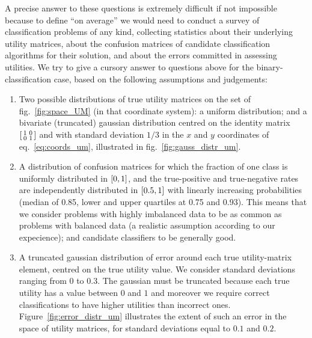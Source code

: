 \documentclass[\ifafour a4paper,12pt,\else a5paper,10pt,\fi%
onecolumn,oneside,article,%
british%
]{memoir}
\theoremstyle{remark}
\theoremstyle{innote}
\DeclarePairedDelimiter\clcl{[}{]}
\renewcommand*{\|}[1][]{\nonscript\:#1\vert\nonscript\:\mathopen{}}
\newcommand*{\eqn}{eq.}%
\newcommand*{\fig}{fig.}%
\begin{document}
A precise answer to these questions is extremely difficult if not impossible because to define \enquote{on average} we would need to conduct a survey of classification problems of any kind, collecting statistics about their underlying utility matrices, about the confusion matrices of candidate classification algorithms for their solution, and about the errors committed in assessing utilities. We try to give a cursory answer to questions above for the binary-classification case, based on the following assumptions and judgements:
\begin{enumerate}[label=(\roman*)]
\item\label{item:distr_um} Two possible distributions of true utility matrices on the set of \fig~\ref{fig:space_UM} (in that coordinate system): a uniform distribution; and a bivariate (truncated) gaussian distribution centred on the identity matrix $\begin{bsmallmatrix} 1&0\\0&1 \end{bsmallmatrix}$ and with standard deviation $1/3$ in the $x$ and $y$ coordinates of \eqn~\eqref{eq:coords_um}, illustrated in \fig~\ref{fig:gauss_distr_um}.

\item\label{item:distr_cm} A distribution of confusion matrices for which the fraction of one class is uniformly distributed in $\clcl{0,1}$, and the true-positive and true-negative rates are independently distributed in $\clcl{0.5, 1}$ with linearly increasing probabilities (median of 0.85,  lower and upper quartiles at 0.75 and 0.93). This means that we consider problems with highly imbalanced data to be as common as problems with balanced data (a realistic assumption according to our expecience); and candidate classifiers to be generally good.
  
\item\label{item:distr_error} A truncated gaussian distribution of error around each true utility-matrix element, centred on the true utility value. We consider standard deviations ranging from $0$ to $0.3$. The gaussian must be truncated because each true utility has a value between $0$ and $1$ and moreover we require correct classifications to have higher utilities than incorrect ones. Figure~\ref{fig:error_distr_um} illustrates the extent of such an error in the space of utility matrices, for standard deviations equal to $0.1$ and $0.2$.
\end{enumerate}
\end{document}
